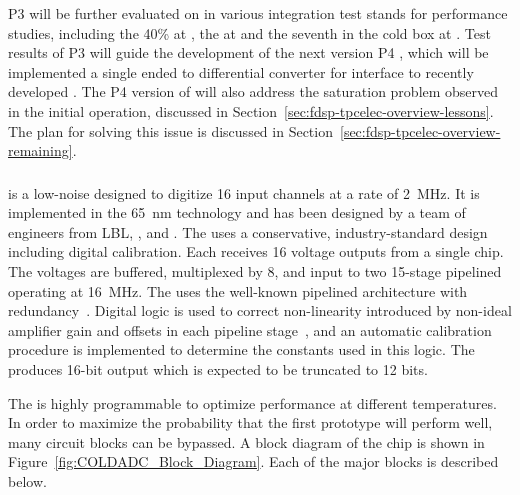 P3   will be further evaluated on  
in various integration test stands for performance studies, including 
the \num{40}\%  at , the   
at  and the seventh   
in the cold box at . Test results of P3   
will guide the development of the next version P4  , 
which will be implemented a single ended to differential converter for 
interface to recently developed . 
 The P4 version of 
 will also address the saturation problem observed in
the  initial operation, discussed in 
Section~\ref{sec:fdsp-tpcelec-overview-lessons}. The plan for solving
this issue is discussed %
in Section~\ref{sec:fdsp-tpcelec-overview-remaining}.

\subsubsection{ }
\label{sec:fdsp-tpcelec-design-femb-adc}

 is a low-noise   designed to digitize
\num{16} input channels at a rate of \SI{2}{MHz}. It is implemented in the 
\SI{65}{nm}  technology and has been designed by a team of engineers
from LBL, , and .  The  uses a conservative,
industry-standard design including digital calibration.  Each 
receives \num{16} voltage outputs from a single  chip.  The voltages
are buffered, multiplexed by \num{8}, and input to two \num{15}-stage pipelined 
operating at \SI{16}{MHz}.  The  uses the well-known pipelined architecture
with redundancy~\cite{PipelinedADC}.  Digital logic is used to correct non-linearity
introduced by non-ideal amplifier gain and offsets in each pipeline
stage~\cite{CalibrationCorrection}, and an automatic calibration procedure is
implemented to determine the constants used in this logic.  The  produces
\num{16}-bit output which is expected to be truncated to \num{12} bits.

The  is highly programmable to optimize performance at different
temperatures.  In order to maximize the probability that the first prototype
 will perform well, many circuit blocks can be bypassed. A block
diagram of the chip is shown in Figure~\ref{fig:COLDADC_Block_Diagram}. Each of
the major blocks is described below.


